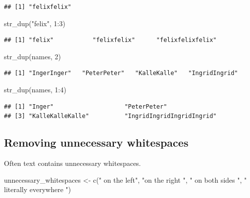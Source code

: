\documentclass[
]{book}
\newenvironment{Shaded}{\begin{snugshade}}{\end{snugshade}}
\newcommand{\DecValTok}[1]{\textcolor[rgb]{0.00,0.00,0.81}{#1}}
\newcommand{\FunctionTok}[1]{\textcolor[rgb]{0.00,0.00,0.00}{#1}}
\newcommand{\NormalTok}[1]{#1}
\newcommand{\OtherTok}[1]{\textcolor[rgb]{0.56,0.35,0.01}{#1}}
\newcommand{\SpecialCharTok}[1]{\textcolor[rgb]{0.00,0.00,0.00}{#1}}
\newcommand{\StringTok}[1]{\textcolor[rgb]{0.31,0.60,0.02}{#1}}
\begin{document}
\begin{verbatim}
## [1] "felixfelix"
\end{verbatim}

\begin{Shaded}
\begin{Highlighting}[]
\FunctionTok{str\_dup}\NormalTok{(}\StringTok{"felix"}\NormalTok{, }\DecValTok{1}\SpecialCharTok{:}\DecValTok{3}\NormalTok{)}
\end{Highlighting}
\end{Shaded}

\begin{verbatim}
## [1] "felix"           "felixfelix"      "felixfelixfelix"
\end{verbatim}

\begin{Shaded}
\begin{Highlighting}[]
\FunctionTok{str\_dup}\NormalTok{(names, }\DecValTok{2}\NormalTok{)}
\end{Highlighting}
\end{Shaded}

\begin{verbatim}
## [1] "IngerInger"   "PeterPeter"   "KalleKalle"   "IngridIngrid"
\end{verbatim}

\begin{Shaded}
\begin{Highlighting}[]
\FunctionTok{str\_dup}\NormalTok{(names, }\DecValTok{1}\SpecialCharTok{:}\DecValTok{4}\NormalTok{)}
\end{Highlighting}
\end{Shaded}

\begin{verbatim}
## [1] "Inger"                    "PeterPeter"              
## [3] "KalleKalleKalle"          "IngridIngridIngridIngrid"
\end{verbatim}

\hypertarget{removing-unnecessary-whitespaces}{%
\subsection{Removing unnecessary whitespaces}\label{removing-unnecessary-whitespaces}}

Often text contains unnecessary whitespaces.

\begin{Shaded}
\begin{Highlighting}[]
\NormalTok{unnecessary\_whitespaces }\OtherTok{\textless{}{-}} \FunctionTok{c}\NormalTok{(}\StringTok{"    on the left"}\NormalTok{, }\StringTok{"on the right    "}\NormalTok{, }\StringTok{"    on both sides   "}\NormalTok{, }\StringTok{"   literally    everywhere  "}\NormalTok{)}
\end{Highlighting}
\end{Shaded}
\end{document}
